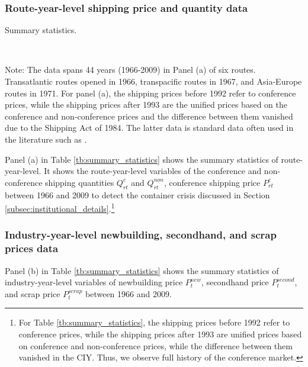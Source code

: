 \documentclass[11pt]{article}
\begin{document}
\subsubsection{Route-year-level shipping price and quantity data}

\begin{table}[!htbp]
  \begin{center}
      \caption{Summary statistics.}
      \label{tb:summary_statistics} 
      \\
  \end{center}\footnotesize
  Note: The data spans 44 years (1966-2009) in Panel (a) of six routes. Transatlantic routes opened in 1966, transpacific routes in 1967, and Asia-Europe routes in 1971. For panel (a), the shipping prices before 1992 refer to conference prices, while the shipping prices after 1993 are the unified prices based on the conference and non-conference prices and the difference between them vanished due to the Shipping Act of 1984. The latter data is standard data often used in the literature such as \cite{jeon2017learning}.
\end{table} 

Panel (a) in Table \ref{tb:summary_statistics} shows the summary statistics of route-year-level. It shows the route-year-level variables of the conference and non-conference shipping quantities $Q_{rt}^{c}$ and $Q_{rt}^{non}$, conference shipping price $P_{rt}^{c}$ between 1966 and 2009 to detect the container crisis discussed in Section \ref{subsec:institutional_details}.\footnote{For Table \ref{tb:summary_statistics}, the shipping prices before 1992 refer to conference prices, while the shipping prices after 1993 are unified prices based on conference and non-conference prices, while the difference between them vanished in the CIY. Thus, we observe full history of the conference market.} 

\subsubsection{Industry-year-level newbuilding, secondhand, and scrap prices data}

Panel (b) in Table \ref{tb:summary_statistics} shows the summary statistics of industry-year-level variables of newbuilding price $P_{t}^{new}$, secondhand price $P_{t}^{second}$, and scrap price $P_{t}^{scrap}$ between 1966 and 2009.
\end{document}

